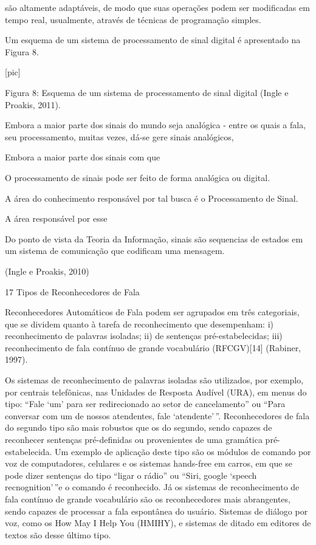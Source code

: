 s\~ao altamente adapt\'aveis, de modo que suas opera\c{c}\~oes podem ser
modificadas em tempo real, usualmente, atrav\'es de t\'ecnicas de
programa\c{c}\~ao simples.

Um esquema de um sistema de processamento de sinal digital \'e apresentado
na Figura 8.

                                [pic]

Figura 8: Esquema de um sistema de processamento de sinal digital (Ingle
e Proakis, 2011).

Embora a maior parte dos sinais do mundo seja anal\'ogica - entre os quais
a fala, seu processamento, muitas vezes, d\'a-se gere sinais anal\'ogicos,

Embora a maior parte dos sinais com que

O processamento de sinais pode ser feito de forma anal\'ogica ou digital.

A \'area do conhecimento respons\'avel por tal busca \'e o Processamento de
Sinal.

A \'area respons\'avel por esse

Do ponto de vista da Teoria da Informa\c{c}\~ao, sinais s\~ao sequencias de
estados em um sistema de comunica\c{c}\~ao que codificam uma mensagem.

(Ingle e Proakis, 2010)

17 Tipos de Reconhecedores de Fala

Reconhecedores Autom\'aticos de Fala podem ser agrupados em tr\^es
categoriais, que se dividem quanto à tarefa de reconhecimento que
desempenham: i) reconhecimento de palavras isoladas; ii) de senten\c{c}as
pr\'e-estabelecidas; iii) reconhecimento de fala cont\'inuo de grande
vocabul\'ario (RFCGV){[}14{]} (Rabiner, 1997).

Os sistemas de reconhecimento de palavras isoladas s\~ao utilizados, por
exemplo, por centrais telef\^onicas, nas Unidades de Resposta Aud\'ivel
(URA), em menus do tipo: ``Fale `um' para ser redirecionado ao setor de
cancelamento'' ou ``Para conversar com um de nossos atendentes, fale
`atendente'\,''. Reconhecedores de fala do segundo tipo s\~ao mais
robustos que os do segundo, sendo capazes de reconhecer senten\c{c}as
pr\'e-definidas ou provenientes de uma gram\'atica pr\'e-estabelecida. Um
exemplo de aplica\c{c}\~ao deste tipo s\~ao os m\'odulos de comando por voz de
computadores, celulares e os sistemas hands-free em carros, em que se
pode dizer senten\c{c}as do tipo ``ligar o r\'adio'' ou ``Siri, google `speech
recnognition'\,''e o comando \'e reconhecido. J\'a os sistemas de
reconhecimento de fala cont\'inuo de grande vocabul\'ario s\~ao os
reconhecedores mais abrangentes, sendo capazes de processar a fala
espont\^anea do usu\'ario. Sistemas de di\'alogo por voz, como os How May I
Help You (HMIHY), e sistemas de ditado em editores de textos s\~ao desse
\'ultimo tipo.


